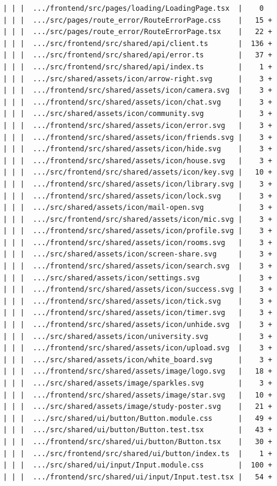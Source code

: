 \documentclass[12pt]{article}
\begin{document}
\begin{lstlisting}[numbers=none,breaklines=true]
| | |  .../frontend/src/pages/loading/LoadingPage.tsx  |    0
| | |  .../src/pages/route_error/RouteErrorPage.css    |   15 +
| | |  .../src/pages/route_error/RouteErrorPage.tsx    |   22 +
| | |  .../src/frontend/src/shared/api/client.ts       |  136 +
| | |  .../src/frontend/src/shared/api/error.ts        |   37 +
| | |  .../src/frontend/src/shared/api/index.ts        |    1 +
| | |  .../src/shared/assets/icon/arrow-right.svg      |    3 +
| | |  .../frontend/src/shared/assets/icon/camera.svg  |    3 +
| | |  .../frontend/src/shared/assets/icon/chat.svg    |    3 +
| | |  .../src/shared/assets/icon/community.svg        |    3 +
| | |  .../frontend/src/shared/assets/icon/error.svg   |    3 +
| | |  .../frontend/src/shared/assets/icon/friends.svg |    3 +
| | |  .../frontend/src/shared/assets/icon/hide.svg    |    3 +
| | |  .../frontend/src/shared/assets/icon/house.svg   |    3 +
| | |  .../src/frontend/src/shared/assets/icon/key.svg |   10 +
| | |  .../frontend/src/shared/assets/icon/library.svg |    3 +
| | |  .../frontend/src/shared/assets/icon/lock.svg    |    3 +
| | |  .../src/shared/assets/icon/mail-open.svg        |    3 +
| | |  .../src/frontend/src/shared/assets/icon/mic.svg |    3 +
| | |  .../frontend/src/shared/assets/icon/profile.svg |    3 +
| | |  .../frontend/src/shared/assets/icon/rooms.svg   |    3 +
| | |  .../src/shared/assets/icon/screen-share.svg     |    3 +
| | |  .../frontend/src/shared/assets/icon/search.svg  |    3 +
| | |  .../src/shared/assets/icon/settings.svg         |    3 +
| | |  .../frontend/src/shared/assets/icon/success.svg |    3 +
| | |  .../frontend/src/shared/assets/icon/tick.svg    |    3 +
| | |  .../frontend/src/shared/assets/icon/timer.svg   |    3 +
| | |  .../frontend/src/shared/assets/icon/unhide.svg  |    3 +
| | |  .../src/shared/assets/icon/university.svg       |    3 +
| | |  .../frontend/src/shared/assets/icon/upload.svg  |    3 +
| | |  .../src/shared/assets/icon/white_board.svg      |    3 +
| | |  .../frontend/src/shared/assets/image/logo.svg   |   18 +
| | |  .../src/shared/assets/image/sparkles.svg        |    3 +
| | |  .../frontend/src/shared/assets/image/star.svg   |   10 +
| | |  .../src/shared/assets/image/study-poster.svg    |   21 +
| | |  .../src/shared/ui/button/Button.module.css      |   49 +
| | |  .../src/shared/ui/button/Button.test.tsx        |   43 +
| | |  .../frontend/src/shared/ui/button/Button.tsx    |   30 +
| | |  .../src/frontend/src/shared/ui/button/index.ts  |    1 +
| | |  .../src/shared/ui/input/Input.module.css        |  100 +
| | |  .../frontend/src/shared/ui/input/Input.test.tsx |   54 +

\end{lstlisting}
\end{document}
